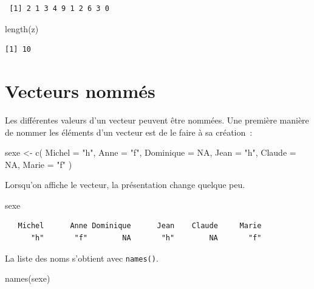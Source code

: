 \documentclass[
  letterpaper,
  DIV=11,
  numbers=noendperiod,
  oneside]{scrreprt}
\newenvironment{Shaded}{\begin{snugshade}}{\end{snugshade}}
\newcommand{\AttributeTok}[1]{\textcolor[rgb]{0.40,0.45,0.13}{#1}}
\newcommand{\ConstantTok}[1]{\textcolor[rgb]{0.56,0.35,0.01}{#1}}
\newcommand{\FunctionTok}[1]{\textcolor[rgb]{0.28,0.35,0.67}{#1}}
\newcommand{\NormalTok}[1]{\textcolor[rgb]{0.00,0.23,0.31}{#1}}
\newcommand{\OtherTok}[1]{\textcolor[rgb]{0.00,0.23,0.31}{#1}}
\newcommand{\StringTok}[1]{\textcolor[rgb]{0.13,0.47,0.30}{#1}}
\begin{document}
\begin{verbatim}
 [1] 2 1 3 4 9 1 2 6 3 0
\end{verbatim}

\begin{Shaded}
\begin{Highlighting}[]
\FunctionTok{length}\NormalTok{(z)}
\end{Highlighting}
\end{Shaded}

\begin{verbatim}
[1] 10
\end{verbatim}

\hypertarget{vecteurs-nommuxe9s}{%
\section{Vecteurs nommés}\label{vecteurs-nommuxe9s}}

Les différentes valeurs d'un vecteur peuvent être nommées. Une première
manière de nommer les éléments d'un vecteur est de le faire à sa
création~:

\begin{Shaded}
\begin{Highlighting}[]
\NormalTok{sexe }\OtherTok{\textless{}{-}} \FunctionTok{c}\NormalTok{(}
  \AttributeTok{Michel =} \StringTok{"h"}\NormalTok{, }\AttributeTok{Anne =} \StringTok{"f"}\NormalTok{, }
  \AttributeTok{Dominique =} \ConstantTok{NA}\NormalTok{, }\AttributeTok{Jean =} \StringTok{"h"}\NormalTok{, }
  \AttributeTok{Claude =} \ConstantTok{NA}\NormalTok{, }\AttributeTok{Marie =} \StringTok{"f"}
\NormalTok{)}
\end{Highlighting}
\end{Shaded}

Lorsqu'on affiche le vecteur, la présentation change quelque peu.

\begin{Shaded}
\begin{Highlighting}[]
\NormalTok{sexe}
\end{Highlighting}
\end{Shaded}

\begin{verbatim}
   Michel      Anne Dominique      Jean    Claude     Marie 
      "h"       "f"        NA       "h"        NA       "f" 
\end{verbatim}

La liste des noms s'obtient avec \texttt{names()}.

\begin{Shaded}
\begin{Highlighting}[]
\FunctionTok{names}\NormalTok{(sexe)}
\end{Highlighting}
\end{Shaded}
\end{document}
